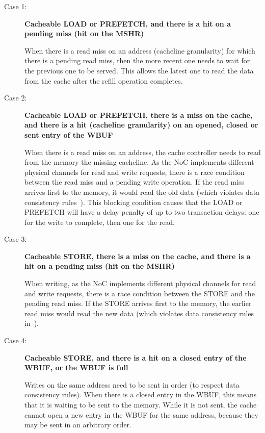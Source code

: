 \documentclass[10pt,titlepage,twoside]{book}
\begin{document}
\begin{description}
  \item[Case 1:] \textbf{Cacheable LOAD or PREFETCH, and there is a hit on a pending miss (hit on the \acs{MSHR})}

When there is a read miss on an address (cacheline granularity) for which there is a pending read miss, then the more recent one needs to wait for the previous one to be served.
This allows the latest one to read the data from the cache after the refill operation completes.

  \item[Case 2:] \textbf{Cacheable LOAD or PREFETCH, there is a miss on the cache, and there is a hit (cacheline granularity) on an opened, closed or sent entry of the \ac{WBUF}}

When there is a read miss on an address, the cache controller needs to read from the memory the missing cacheline.
As the \ac{NoC} implements different physical channels for read and write requests, there is a race condition between the read miss and a pending write operation.
If the read miss arrives first to the memory, it would read the old data (which violates data consistency rules~).
This blocking condition causes that the LOAD or PREFETCH will have a delay penalty of up to two transaction delays: one for the write to complete, then one for the read.

  \item[Case 3:] \textbf{Cacheable STORE, there is a miss on the cache, and there is a hit on a pending miss (hit on the \acs{MSHR})}

When writing, as the \ac{NoC} implements different physical channels for read and write requests, there is a race condition between the STORE and the pending read miss.
If the STORE arrives first to the memory, the earlier read miss would read the new data (which violates data consistency rules in~).

  \item[Case 4:] \textbf{Cacheable STORE, and there is a hit on a closed entry of the \ac{WBUF}, or the \ac{WBUF} is full}

Writes on the same address need to be sent in order (to respect data consistency rules).
When there is a closed entry in the \ac{WBUF}, this means that it is waiting to be sent to the memory.
While it is not sent, the cache cannot open a new entry in the \ac{WBUF} for the same address, because they may be sent in an arbitrary order.


\end{description}
\end{document}
